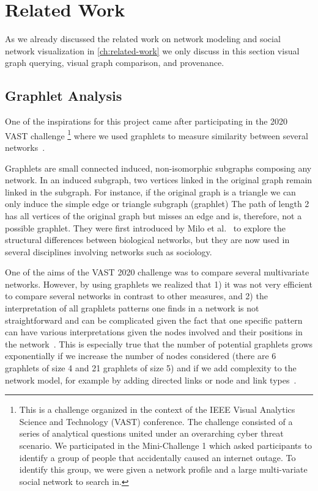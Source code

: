 \section{Related Work}

As we already discussed the related work on network modeling and social network visualization in \autoref{ch:related-work} we only discuss in this section visual graph querying, visual graph comparison, and provenance.


\subsection{Graphlet Analysis}

One of the inspirations for this project came after participating in the 2020 VAST challenge \footnote{This is a challenge organized in the context of the IEEE Visual Analytics Science and Technology (VAST) conference. The challenge consisted of a series of analytical questions united under an overarching cyber threat scenario. We participated in the Mini-Challenge 1 which asked participants to identify a group of people that accidentally caused an internet outage. To identify this group, we were given a network profile and a large multi-variate social network to search in.} where we used graphlets to measure similarity between several networks~\cite{tovanichVAST2020Contest2021}.

Graphlets are small connected induced, non-isomorphic subgraphs composing any network.
In an induced subgraph, two vertices linked in the original graph remain linked in the subgraph.
For instance, if the original graph is a triangle we can only induce the simple edge or triangle subgraph (graphlet)
The path of length 2 has all vertices of the original graph but misses an edge and is, therefore, not a possible graphlet.
They were first introduced by Milo et al.~\cite{miloNetworkMotifsSimple2002} to explore the structural differences between biological networks, but they are now used in several disciplines involving networks such as sociology.

One of the aims of the VAST 2020 challenge was to compare several multivariate networks.
However, by using graphlets we realized that 1) it was not very efficient to compare several networks in contrast to other measures, and 2) the interpretation of all graphlets patterns one finds in a network is not straightforward and can be complicated given the fact that one specific pattern can have various interpretations given the nodes involved and their positions in the network~\cite{ingramNetworkMotifsStructure2006}.
This is especially true that the number of potential graphlets grows exponentially if we increase the number of nodes considered (there are 6 graphlets of size 4 and 21 graphlets of size 5) and if we add complexity to the network model, for example by adding directed links or node and link types~\cite{ribeiroDiscoveringColoredNetwork2014}.

